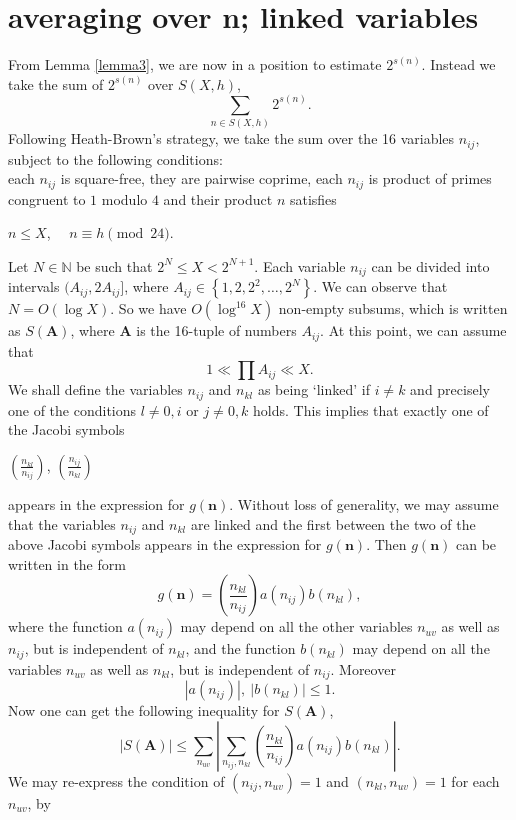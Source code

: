 \documentclass[11pt]{article}
\newcommand{\n}{\textbf{n}}
\newcommand{\A}{ \textbf{A} }
\begin{document}
\section{averaging over \textbf{n}; linked variables}
\noindent From Lemma \ref{lemma3}, we are now in a position to estimate $2^{s(n)}$. Instead we take the sum of $2^{s(n)}$ over $S(X,h)$,
$$\sum\limits_{n\in S(X,h)}2^{s(n)}.$$ 
Following Heath-Brown's strategy, we take the sum over the 16 variables $n_{ij}$, subject to the following conditions: \\
each  $n_{ij}$ is square-free, they are pairwise coprime, each $n_{ij}$ is product of primes congruent to $1$ modulo $4$ and their product $n$ satisfies
\begin{center}
$n\leq X$, $\quad n\equiv h\pmod{24}$.
\end{center}
Let $N\in \mathbb{N}$ be such that $2^{N}\leq X<2^{N+1}$. Each variable $n_{ij}$ can be divided into intervals $(A_{ij},2A_{ij}]$, where $A_{ij}\in \left\{1,2,2^{2},\ldots,2^{N}\right\}$. We can observe that $N=O(\log
X)$. So we have $O(\log^{16} X)$ non-empty subsums, which is written as $S(\A)$, where $\A$ is the 16-tuple of numbers $A_{ij}$. At this point, we can assume that
\begin{equation}\label{eq:3}
1\ll \prod A_{ij}\ll X.
\end{equation}
We shall define the variables $n_{ij}$ and $n_{kl}$ as being `linked' if $i\neq k$ and precisely one of the conditions $l\neq 0,i$ or $j\neq 0,k$ holds. This implies that exactly one of the Jacobi symbols 
\begin{center}
$\left(\frac{n_{kl}}{n_{ij}}\right)$, $\left(\frac{n_{ij}}{n_{kl}}\right)$
\end{center}
appears in the expression for $g(\n)$. Without loss of generality, we may assume that the variables $n_{ij}$ and $n_{kl}$ are linked and the first between the two of the above Jacobi symbols appears in the expression for $g(\n)$. Then $g(\n)$ can be written in the form
$$g(\n)=\left(\frac{n_{kl}}{n_{ij}}\right)a(n_{ij})b(n_{kl}),$$
where the function $a(n_{ij})$ may depend on all the other variables $n_{uv}$ as well as $n_{ij}$, but is independent of $n_{kl}$, and the function $b(n_{kl})$ may depend on all the variables $n_{uv}$ as well as $n_{kl}$, but is independent of $n_{ij}$. Moreover
$$|a(n_{ij})|,\:|b(n_{kl})|\leq 1.$$
Now one can get the following inequality for $S(\A)$,
$$|S(\A)|\leq \sum\limits_{n_{uv}}|\sum\limits_{n_{ij},n_{kl}}\left(\frac{n_{kl}}{n_{ij}}\right)a(n_{ij})b(n_{kl})|.$$
We may re-express the condition of $(n_{ij}, n_{uv})=1$ and $(n_{kl}, n_{uv})=1$ for each $n_{uv}$, by 
\end{document}
